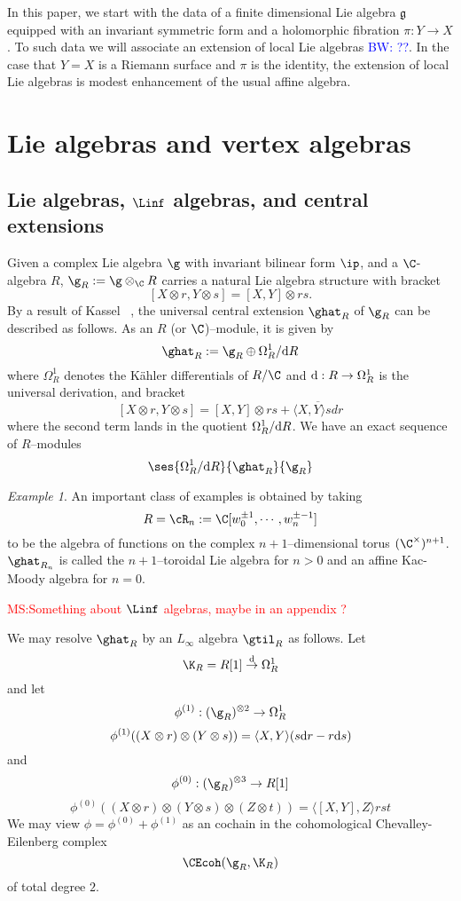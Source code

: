 \documentclass[12pt]{amsart}
\theoremstyle{definition}
\theoremstyle{remark}
\newtheorem{eg}[theorem]{Example}
\newcommand{\R}{R}
\def\d{{\rm d}}
\def\fg{\mathfrak{g}}
\def\brian{\textcolor{blue}{BW: }\textcolor{blue}}
\def\matt{\textcolor{red}{MS:}\textcolor{red}}
\begin{document}
In this paper, we start with the data of a finite dimensional Lie algebra $\fg$ equipped with an invariant symmetric form and a holomorphic fibration $\pi : Y \to X$. 
To such data we will associate an extension of local Lie algebras \brian{??}.
In the case that $Y = X$ is a Riemann surface and $\pi$ is the identity, the extension of local Lie algebras is modest enhancement of the usual affine algebra.


\section{Lie algebras and vertex algebras}
\subsection{Lie algebras, $\Linf$ algebras, and central extensions}


Given a complex Lie algebra $\g$ with invariant bilinear form $\ip$, and a $\C$-algebra $\R$, $ \g_{\R} := \g \otimes_{\C} \R$ carries a natural Lie algebra structure with bracket
\[
[X \otimes r, Y \otimes s] = [X,Y] \otimes rs.
\]
By a result of Kassel ~\cite{Kassel}, the universal central extension $\ghat_{\R}$ of $\g_{\R}$ can be described as follows. As an $\R$ (or $\C$)--module, it is given by
\begin{equation} \label{uce}
\ghat_{\R} := \g_{\R} \oplus \Omega^1_{\R} / \d \R
\end{equation}
where $\Omega^1_{\R}$ denotes the K\"{a}hler differentials of $\R/\C$ and $\d: \R \rightarrow \Omega^{1}_{\R}$ is the universal derivation, and bracket
\[
[X \otimes r, Y \otimes s] =  [X,Y] \otimes rs + \overline{\langle X, Y \rangle s dr}
\]
where the second term lands in the quotient $\Omega^1_{\R} / \d \R$. We have an exact sequence of $\R$--modules
\[
\ses{\Omega^1_{\R} / \d \R}{\ghat_{\R}}{\g_{\R}}
\]

\begin{eg}

An important class of examples is obtained by taking
\[
\R= \cR_n := \C[w^{\pm 1}_0, \cdots, w^{\pm -1}_n]
\]
to be the algebra of functions on the complex $n+1$--dimensional torus $(\C^{\times})^{n+1}$. $\ghat_{\R_n}$ is called the $n+1$--toroidal Lie algebra for $n >0$ and an affine Kac-Moody algebra for $n=0$. 

\end{eg}

\matt{Something about $\Linf$ algebras, maybe in an appendix ?}

We may resolve $\ghat_{\R}$ by an $L_{\infty}$ algebra $\gtil_{\R}$ as follows. Let 
\[
\K_{\R} = \R[1] \overset{\d}{\rightarrow} \Omega^{1}_{\R}
\]
and let
$$ \phi^{(1)}: (\g_{\R})^{\otimes 2} \rightarrow \Omega^1_{\R} $$
$$ \phi^{(1)} ((X \otimes r) \otimes (Y \otimes s)) = \langle X, Y \rangle (s \d r - r \d s) $$
and 
$$ \phi^{(0)}: (\g_{\R})^{\otimes 3} \rightarrow R[1] $$
$$ \phi^{(0)}( (X \otimes r)\otimes(Y \otimes s) \otimes (Z \otimes t)) = \langle [X,Y], Z \rangle rst $$
We may view $\phi = \phi^{(0)} + \phi^{(1)}$ as an cochain in the cohomological Chevalley-Eilenberg complex $$ \CEcoh(\g_{\R}, \K_{\R}) $$ of total degree $2$.
\end{document}
